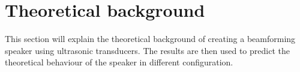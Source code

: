 \chapter{Theoretical background}
%
This section will explain the theoretical background of creating a beamforming speaker using ultrasonic transducers. The results are then used to predict the theoretical behaviour of the speaker in different configuration.
%

